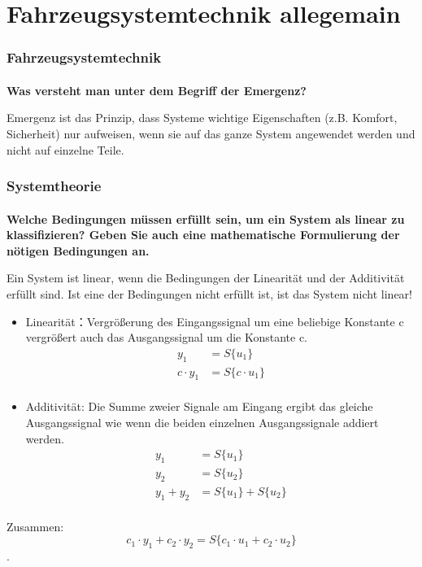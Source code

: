 \setcounter{section}{0}
\part{Fahrzeugsystemtechnik allegemain}
\section{Fahrzeugsystemtechnik}
\subsection{}\textbf{Was versteht man unter dem Begriff der Emergenz?}

Emergenz ist das Prinzip, dass Systeme wichtige Eigenschaften (z.B. Komfort, Sicherheit) nur aufweisen, wenn sie auf das ganze System angewendet werden und nicht auf einzelne Teile.

\section{Systemtheorie}
\subsection{}
\textbf{Welche Bedingungen müssen erfüllt sein, um ein System als linear zu klassifizieren? Geben Sie auch eine mathematische Formulierung der nötigen Bedingungen an.}

Ein System ist linear, wenn die Bedingungen der Linearität und der Additivität erfüllt sind. Ist eine der Bedingungen nicht erfüllt ist, ist das System nicht linear!
\begin{itemize}
    \item Linearit\"at：Vergrößerung des Eingangssignal um eine beliebige Konstante c vergrößert auch das Ausgangssignal um die Konstante c.
          \begin{equation}
              \begin{aligned}
                  y_1        & =S\{u_1\}        \\
                  c\cdot y_1 & =S\{c\cdot u_1\} \\
              \end{aligned}
          \end{equation}
    \item Additivit\"at: Die Summe zweier Signale am Eingang ergibt das gleiche Ausgangssignal wie wenn die beiden einzelnen Ausgangssignale addiert werden.
          \begin{equation}
              \begin{aligned}
                  y_1     & =S\{u_1\}          \\
                  y_2     & =S\{u_2\}          \\
                  y_1+y_2 & =S\{u_1\}+S\{u_2\} \\
              \end{aligned}
          \end{equation}
\end{itemize}
Zusammen:
\begin{equation}
    c_1\cdot y_1+c_2\cdot y_2=S\{c_1\cdot u_1+c_2\cdot u_2\}
\end{equation}.

